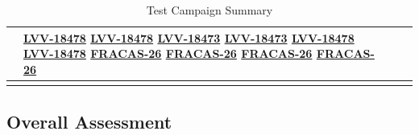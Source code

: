 \documentclass[SE,lsstdraft,STR,toc]{lsstdoc}
\begin{document}
\begin{longtable}{p{2cm}p{2.5cm}p{9cm}p{2.5cm}}
\begin{minipage}[]{9cm}
    \medskip
    \end{minipage}
    &
          \href{https://jira.lsstcorp.org/browse/LVV-18478}{LVV-18478}
          \href{https://jira.lsstcorp.org/browse/LVV-18478}{LVV-18478}
          \href{https://jira.lsstcorp.org/browse/LVV-18473}{LVV-18473}
          \href{https://jira.lsstcorp.org/browse/LVV-18473}{LVV-18473}
          \href{https://jira.lsstcorp.org/browse/LVV-18478}{LVV-18478}
          \href{https://jira.lsstcorp.org/browse/LVV-18478}{LVV-18478}
          \href{https://jira.lsstcorp.org/browse/FRACAS-26}{FRACAS-26}
          \href{https://jira.lsstcorp.org/browse/FRACAS-26}{FRACAS-26}
          \href{https://jira.lsstcorp.org/browse/FRACAS-26}{FRACAS-26}
          \href{https://jira.lsstcorp.org/browse/FRACAS-26}{FRACAS-26}
    \\\hline
\caption{Test Campaign Summary}
\label{table:summary}
\end{longtable}

\subsection{Overall Assessment}
\label{sect:overallassessment}
\end{document}
